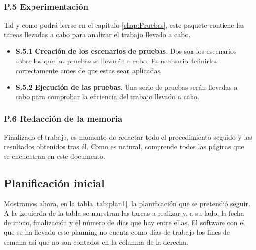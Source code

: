 \subsubsection{P.5 Experimentación}
Tal y como podrá leerse en el capítulo \ref{chap:Pruebas}, este paquete contiene las tareas llevadas a cabo para analizar el trabajo llevado a cabo.
\begin{itemize}
\item \textbf{S.5.1 Creación de los escenarios de pruebas}. Dos son los escenarios sobre los que las pruebas se llevarán a cabo. Es necesario definirlos correctamente antes de que estas sean aplicadas.
\item \textbf{S.5.2 Ejecución de las pruebas}. Una serie de pruebas serán llevadas a cabo para comprobar la eficiencia del trabajo llevado a cabo.
\end{itemize}

\subsubsection{P.6 Redacción de la memoria}
Finalizado el trabajo, es momento de redactar todo el procedimiento seguido y los resultados obtenidos tras él. Como es natural, comprende todos las páginas que se encuentran en este documento.

\subsection{Planificación inicial}
Mostramos ahora, en la tabla \ref{tab:plan1}, la planificación que se pretendió seguir. A la izquierda de la tabla se muestran las tareas a realizar y, a su lado, la fecha de inicio, finalización y el número de días que hay entre ellas. El software con el que se ha llevado este planning no cuenta como días de trabajo los fines de semana así que no son contados en la columna de la derecha.

